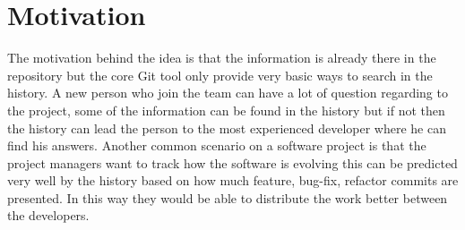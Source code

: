 \section{Motivation}
The motivation behind the idea is that the information is already there in the repository but the core Git tool only provide very basic ways to search in the history.\newline
A new person who join the team can have a lot of question regarding to the project, some of the information can be found in the history but if not then the history can lead the person to the most experienced developer where he can find his answers.\newline
Another common scenario on a software project is that the project managers want to track how the software is evolving this can be predicted very well by the history based on how much feature, bug-fix, refactor commits are presented. In this way they would be able to distribute the work better between the developers.